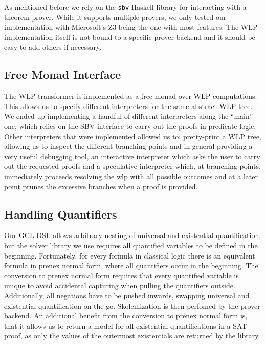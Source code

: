 \documentclass[]{scrartcl}
\begin{document}
As mentioned before we rely on the \texttt{sbv} Haskell library for interacting with a theorem prover.
While it supports multiple provers, we only tested our implementation with Microsoft's Z3 being the
one with most features.
The WLP implementation itself is not bound to a specific prover backend and it should be easy to
add others if necessary.

\subsection{Free Monad Interface}

The WLP transformer is implemented as a free monad over WLP computations.
This allows us to specify different interpreters for the same abstract WLP tree.
We ended up implementing a handful of different interpreters along the ``main''
one, which relies on the SBV interface to carry out the proofs in predicate logic.
Other interpreters that were implemented allowed us to: pretty-print a WLP tree,
allowing us to inspect the different branching points and in general providing
a very useful debugging tool, an interactive interpreter which asks the user
to carry out the requested proofs and a speculative interpreter which, at branching
points, immediately proceeds resolving the wlp with all possible outcomes and
at a later point prunes the excessive branches when a proof is provided.

\subsection{Handling Quantifiers}

Our GCL DSL allows arbitrary nesting of universal and existential quantification,
but the solver library we use requires all quantified variables to be defined in
the beginning.
Fortunately, for every formula in classical logic there is an equivalent formula
in prenex normal form, where all quantifiers occur in the beginning.
The conversion to prenex normal form requires that every quantified variable is
unique to avoid accidental capturing when pulling the quantifiers outside.
Additionally, all negations have to be pushed inwards, swapping universal and
existential quantification on the go.
Skolemization is then perfomed by the prover backend.
An additional benefit from the conversion to prenex normal form is, that it allows
us to return a model for all existential quantifications in a SAT proof, as only
the values of the outermost existentials are returned by the library.
\end{document}
